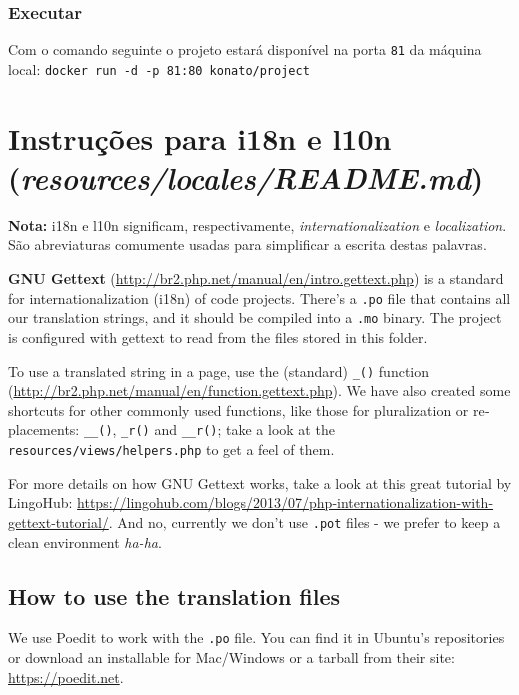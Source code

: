 \documentclass[12pt,a4paper,twoside,hyphens,english,brazil]{abntex2}
\begin{document}
{\subsubsection{Executar}
Com o comando seguinte o projeto estará disponível na porta \texttt{81} da máquina local: \texttt{docker run -d -p 81:80 konato/project}


\section{Instruções para i18n e l10n (\emph{resources/locales/README.md})}

\begin{framed}
	\noindent
	\textbf{Nota:} i18n e l10n significam, respectivamente, \emph{internationalization} e \emph{localization}. São abreviaturas comumente usadas para simplificar a escrita destas palavras.
\end{framed}

\begin{otherlanguage}{english}

\textbf{GNU Gettext} (\url{http://br2.php.net/manual/en/intro.gettext.php}) is a standard for internationalization (i18n) of code projects. There's a \texttt{.po} file that contains all our translation strings, and it should be compiled into a \texttt{.mo} binary. The project is configured with gettext to read from the files stored in this folder.

To use a translated string in a page, use the (standard) \texttt{\_()} function (\url{http://br2.php.net/manual/en/function.gettext.php}). We have also created some shortcuts for other commonly used functions, like those for pluralization or replacements: \texttt{\_\_()}, \texttt{\_r()} and \texttt{\_\_r()}; take a look at the \texttt{resources/views/helpers.php} to get a feel of them.

For more details on how GNU Gettext works, take a look at this great tutorial by LingoHub: \url{https://lingohub.com/blogs/2013/07/php-internationalization-with-gettext-tutorial/}. And no, currently we don't use \texttt{.pot} files - we prefer to keep a clean environment \emph{ha-ha}. 

\subsection{How to use the translation files}
We use Poedit to work with the \texttt{.po} file. You can find it in Ubuntu's repositories or download an installable for Mac/Windows or a tarball from their site: \url{https://poedit.net}.


\end{otherlanguage}}
\end{document}
